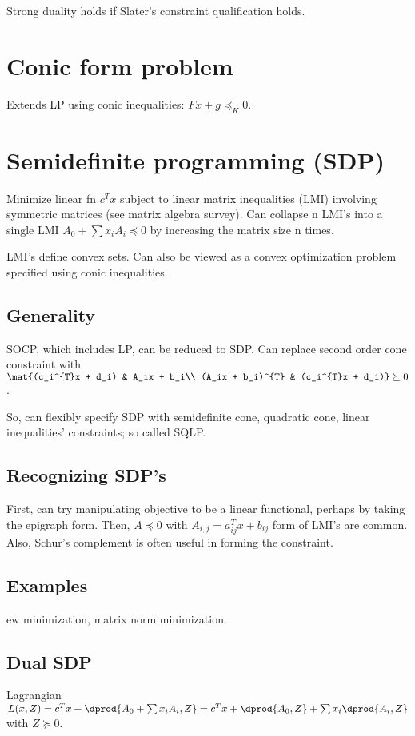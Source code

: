 \documentclass[oneside, article]{memoir}
\begin{document}
Strong duality holds if Slater's constraint qualification holds.

\section{Conic form problem}
Extends LP using conic inequalities: $Fx + g \preceq_K 0$.

\section{Semidefinite programming (SDP)}
Minimize linear fn $c^{T}x$ subject to linear matrix inequalities (LMI) involving symmetric matrices (see matrix algebra survey). Can collapse n LMI's into a single LMI $A_0 + \sum x_iA_i \preceq 0$ by increasing the matrix size n times.

LMI's define convex sets. Can also be viewed as a convex optimization problem specified using conic inequalities.

\subsection{Generality}
SOCP, which includes LP, can be reduced to SDP. Can replace second order cone constraint with $\mat{(c_i^{T}x + d_i) & A_ix + b_i\\
(A_ix + b_i)^{T} & (c_i^{T}x + d_i)} \succeq 0$. \why

So, can flexibly specify SDP with semidefinite cone, quadratic cone, linear inequalities' constraints; so called SQLP.

\subsection{Recognizing SDP's}
First, can try manipulating objective to be a linear functional, perhaps by taking the epigraph form. Then, $A \preceq 0$ with $A_{i,j} = a_{ij}^{T}x + b_{ij}$ form of LMI's are common. Also, Schur's complement is often useful in forming the constraint.

\subsection{Examples}
ew minimization, matrix norm minimization.


\subsection{Dual SDP}
Lagrangian $L(x, Z) = c^{T}x + \dprod{A_0 + \sum x_iA_i, Z} = c^{T}x + \dprod{A_0, Z} + \sum x_i\dprod{A_i, Z}$ with $Z \succeq 0$.
\end{document}
